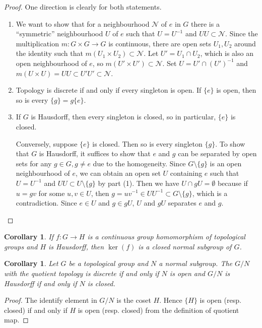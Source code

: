 \documentclass[12pt]{report}
\newtheorem{corollary}[theorem]{Corollary}
\theoremstyle{definition}
\begin{document}
\begin{proof}
	One direction is clearly for both statements.
	\begin{enumerate}
		\item We want to show that for a neighbourhood $\mathcal{N}$ of $e$ in $G$ there is a ``symmetric'' neighbourhood $U$ of $e$ such that $U=U^{-1}$ and $UU\subset \mathcal{N}$. Since the multiplication $m: G\times G\to G$ is continuous, there are open sets $U_1, U_2$ around the identity such that $m(U_1\times U_2)\subset \mathcal{N}$. Let $U'=U_1\cap U_2$, which is also an open neighbourhood of $e$, so $m(U'\times U')\subset \mathcal{N}$. Set $U=U'\cap(U')^{-1}$ and $m(U\times U)=UU\subset U'U'\subset \mathcal{N}$.
		\item Topology is discrete if and only if every singleton is open. If $\{e\}$ is open, then so is every $\{g\}=g\{e\}$.
		\item If $G$ is Hausdorff, then every singleton is closed, so in particular, $\{e\}$ is closed.

		      Conversely, suppose $\{e\}$ is closed. Then so is every singleton $\{g\}$. To show that $G$ is Hausdorff, it suffices to show that $e$ and $g$ can be separated by open sets for any $g\in G, g\not=e$ due to the homogeneity. Since $G\setminus\{g\}$ is an open neighbourhood of $e$, we can obtain an open set $U$ containing $e$ such that $U=U^{-1}$ and $UU\subset U\setminus \{g\}$ by part (1). Then we have $U\cap gU=\emptyset$ because if $u=gv$ for some $u,v\in U$, then $g=uv^{-1}\in UU^{-1} \subset G\setminus\{g\}$, which is a contradiction. Since $e\in U$ and $g\in gU$, $U$ and $gU$ separates $e$ and $g$.
	\end{enumerate}
\end{proof}

\begin{corollary}
	If $f:G\to H$ is a continuous group homomorphism of topological groups and $H$ is Hausdorff, then $\ker(f)$ is a closed normal subgroup of $G$.
\end{corollary}

\begin{corollary}\label{26.12}
	Let $G$ be a topological group and $N$ a normal subgroup. The $G/N$ with the quotient topology is discrete if and only if $N$ is open and $G/N$ is Hausdorff if and only if $N$ is closed.
\end{corollary}

\begin{proof}
	The identify element in $G/N$ is the coset $H$. Hence $\{H\}$ is open (resp. closed) if and only if $H$ is open (resp. closed) from the definition of quotient map.
\end{proof}
\end{document}
